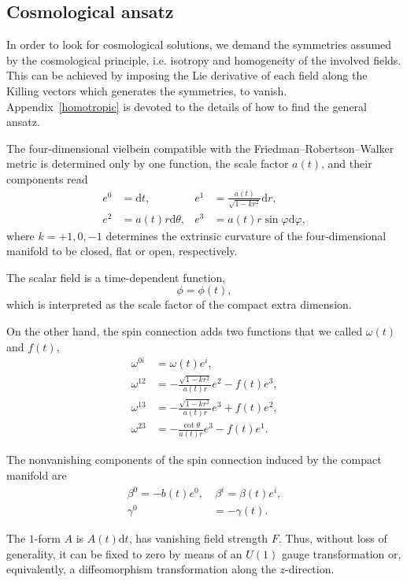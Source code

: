 \documentclass[aps,prd,12pt,superscriptaddress,showpacs,showkeys,longbibliography,reprint,nofootinbib]{revtex4-1}
\begin{document}
\subsection{Cosmological ansatz}

In order to look for cosmological solutions, we demand the symmetries assumed by the cosmological principle, i.e. isotropy and homogeneity of the involved fields. This can be achieved by imposing the Lie derivative of each field along the Killing vectors which generates the symmetries, to vanish. Appendix~\ref{homotropic} is devoted to the details of how to find the general ansatz.

The four-dimensional vielbein compatible with the Friedman--Robertson--Walker metric is determined only by one function, the scale factor $a(t)$, and their components read
\begin{align}
  \label{vielbein cosmo}
  e^0&=\mbox{d}t, & e^1&=\frac{a(t)}{\sqrt{1-kr^2}}\mbox{d}r,\\
  e^2&=a(t)r\mbox{d}\theta, & e^3&=a(t)r\sin\varphi\mbox{d}\varphi, 
\end{align}
where $k=+1,0,-1$ determines the extrinsic curvature of the four-dimensional manifold to be closed, flat or open, respectively. 

The scalar field is a time-dependent function, 
\begin{equation}
  \phi=\phi(t),
\end{equation}
which is interpreted as the scale factor of the compact extra dimension.

On the other hand, the spin connection adds two functions that we called $\omega(t)$ and $f(t)$,
\begin{align}
  \omega^{0i}&=\omega(t) e^i,\\
  \omega^{12}&=-\frac{\sqrt{1-kr^2}}{a(t)r}e^2-f(t)e^3,\\
  \omega^{13}&=-\frac{\sqrt{1-kr^2}}{a(t)r}e^3+f(t)e^2,\\
  \omega^{23}&=-\frac{\cot\theta}{a(t)r}e^3-f(t)e^1.
\end{align}

The nonvanishing components of the spin connection induced by the compact manifold are
\begin{align}
  \beta^0=-b(t)e^0,&\ \beta^i=\beta(t)e^i,\\
  \label{gamma cosmo}
  \gamma^0&=-\gamma(t).
\end{align}

The $1$-form $A$ is $A(t)\text{d}t$, has vanishing field strength $F$. Thus, without loss of generality, it can be fixed to zero by means of an $U(1)$ gauge transformation or, equivalently, a diffeomorphism transformation along the $z$-direction.
\end{document}
